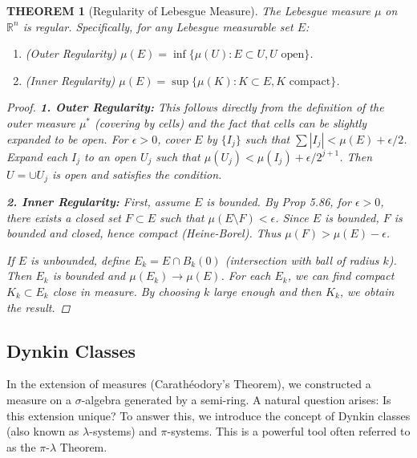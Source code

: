 \documentclass[12pt]{article}
\theoremstyle{blueplain}
\newtheorem{theorem}{THEOREM}[section]
\theoremstyle{bluedef}
\theoremstyle{blueremark}
\newcommand{\R}{\mathbb{R}}
\numberwithin{equation}{section}
\begin{document}
\begin{theorem}[Regularity of Lebesgue Measure]
  The Lebesgue measure $\mu$ on $\R^n$ is regular.
  Specifically, for any Lebesgue measurable set $E$:
  \begin{enumerate}
    \item (Outer Regularity) $\mu(E) = \inf \{ \mu(U) : E \subset U, U \text{ open} \}$.
    \item (Inner Regularity) $\mu(E) = \sup \{ \mu(K) : K \subset E, K \text{ compact} \}$.
  \end{enumerate}

  \begin{proof}
    \textbf{1. Outer Regularity:}
    This follows directly from the definition of the outer measure $\mu^*$ (covering by cells) and the fact that cells can be slightly expanded to be open.
    For $\epsilon > 0$, cover $E$ by $\{I_j\}$ such that $\sum |I_j| < \mu(E) + \epsilon/2$. Expand each $I_j$ to an open $U_j$ such that $\mu(U_j) < \mu(I_j) + \epsilon/2^{j+1}$. Then $U = \cup U_j$ is open and satisfies the condition.

    \textbf{2. Inner Regularity:}
    First, assume $E$ is bounded. By Prop 5.86, for $\epsilon > 0$, there exists a closed set $F \subset E$ such that $\mu(E \setminus F) < \epsilon$. Since $E$ is bounded, $F$ is bounded and closed, hence compact (Heine-Borel). Thus $\mu(F) > \mu(E) - \epsilon$.

    If $E$ is unbounded, define $E_k = E \cap B_k(0)$ (intersection with ball of radius $k$). Then $E_k$ is bounded and $\mu(E_k) \to \mu(E)$.
    For each $E_k$, we can find compact $K_k \subset E_k$ close in measure. By choosing $k$ large enough and then $K_k$, we obtain the result.
  \end{proof}
\end{theorem}

\clearpage

\subsection{Dynkin Classes}

In the extension of measures (Carathéodory's Theorem), we constructed a measure on a $\sigma$-algebra generated by a semi-ring. A natural question arises: Is this extension unique?
To answer this, we introduce the concept of Dynkin classes (also known as $\lambda$-systems) and $\pi$-systems. This is a powerful tool often referred to as the $\pi$-$\lambda$ Theorem.
\end{document}
